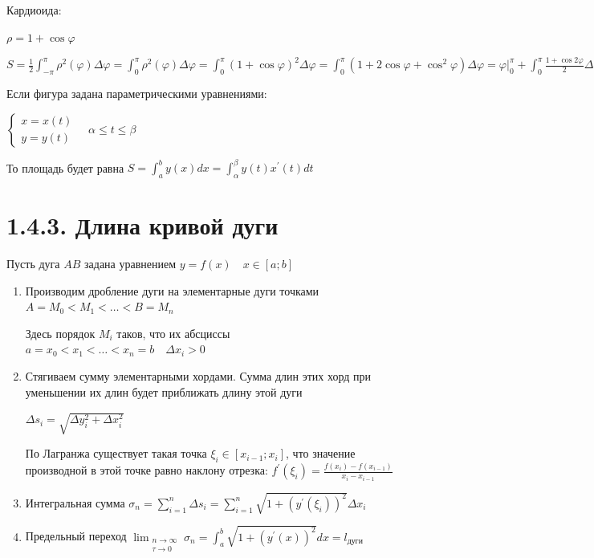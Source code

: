 \documentclass[12pt]{article}
\begin{document}
    \Ex Кардиоида:

    $\rho = 1 + \cos\varphi$

    $S = \frac{1}{2}\int^{\pi}_{-\pi} \rho^2 (\varphi) \Delta \varphi = \int_0^\pi \rho^2 (\varphi) \Delta \varphi =
    \int_0^\pi (1 + \cos\varphi)^2 \Delta \varphi = \int_0^\pi (1 + 2\cos\varphi + \cos^2\varphi) \Delta \varphi =
    \varphi \Big|_0^\pi + \int_0^\pi \frac{1 + \cos2\varphi}{2} \Delta \varphi = \pi + \frac{1}{2}\pi = \frac{3}{2}\pi$

    \Nota Если фигура задана параметрическими уравнениями:

    $\begin{cases}x = x(t) \\ y = y(t)\end{cases} \quad \alpha \leq t \leq \beta$

    То площадь будет равна $S = \int_a^b y(x)dx = \int^\beta_\alpha y(t)x^\prime(t)dt$

    \section{1.4.3. Длина кривой дуги}

    \hypertarget{lengthofarc}{Пусть дуга $AB$ задана уравнением $y = f(x) \quad x \in [a;b]$}

    \begin{enumerate}
        \item Производим дробление дуги на элементарные дуги точками $A = M_0 < M_1 < \dots < B = M_n$

        Здесь порядок $M_i$ таков, что их абсциссы $a = x_0 < x_1 < \dots < x_n = b \quad \Delta x_i > 0$

        \item Стягиваем сумму элементарными хордами. Сумма длин этих хорд при уменьшении их длин будет приближать длину этой дуги

        $\Delta s_i = \sqrt{\Delta y^2_i + \Delta x_i^2}$

        По \Ths Лагранжа существует такая точка $\xi_i \in [x_{i-1};x_i]$,
        что значение производной в этой точке равно наклону отрезка: $f^\prime(\xi_i) = \frac{f(x_i) - f(x_{i-1})}{x_i - x_{i-1}}$

        \item Интегральная сумма $\sigma_n = \sum_{i=1}^n \Delta s_i = \sum_{i=1}^n \sqrt{1 + (y^\prime(\xi_i))^2} \Delta x_i$

        \item Предельный переход $\lim_{\substack{n\to\infty \\ \tau \to 0}} \sigma_n = \int_a^b \sqrt{1 + (y^\prime(x))^2} dx = l_\text{дуги}$
    \end{enumerate}
\end{document}
